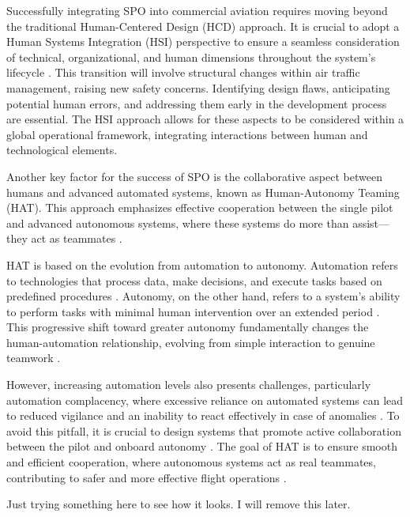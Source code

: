 \documentclass[12pt,a4paper]{article} %
\begin{document}
	Successfully integrating SPO into commercial aviation requires moving beyond the traditional Human-Centered Design (HCD) approach. It is crucial to adopt a Human Systems Integration (HSI) perspective to ensure a seamless consideration of technical, organizational, and human dimensions throughout the system's lifecycle \parencite{boy_prodec_2024}. This transition will involve structural changes within air traffic management, raising new safety concerns. Identifying design flaws, anticipating potential human errors, and addressing them early in the development process are essential. The HSI approach allows for these aspects to be considered within a global operational framework, integrating interactions between human and technological elements.
	
	Another key factor for the success of SPO is the collaborative aspect between humans and advanced automated systems, known as Human-Autonomy Teaming (HAT). This approach emphasizes effective cooperation between the single pilot and advanced autonomous systems, where these systems do more than assist—they act as teammates \parencite{shively_autonomy_2017}.
	
	HAT is based on the evolution from automation to autonomy. Automation refers to technologies that process data, make decisions, and execute tasks based on predefined procedures \parencite{hoff_trust_2015, hancock_imposing_2017}. Autonomy, on the other hand, refers to a system’s ability to perform tasks with minimal human intervention over an extended period \parencite{endsley_here_2017, holbrook_enabling_2020}. This progressive shift toward greater autonomy fundamentally changes the human-automation relationship, evolving from simple interaction to genuine teamwork \parencite{endsley_here_2017}.
	
	However, increasing automation levels also presents challenges, particularly automation complacency, where excessive reliance on automated systems can lead to reduced vigilance and an inability to react effectively in case of anomalies \parencite{lee_design_2023}. To avoid this pitfall, it is crucial to design systems that promote active collaboration between the pilot and onboard autonomy \parencite{endsley_here_2017}. The goal of HAT is to ensure smooth and efficient cooperation, where autonomous systems act as real teammates, contributing to safer and more effective flight operations \parencite{mcneese_chapter_2020}.
	
	Just trying something here to see how it looks. I will remove this later. \parencite{aerospace_technology_institute_ati-insight_2019}
\end{document}
